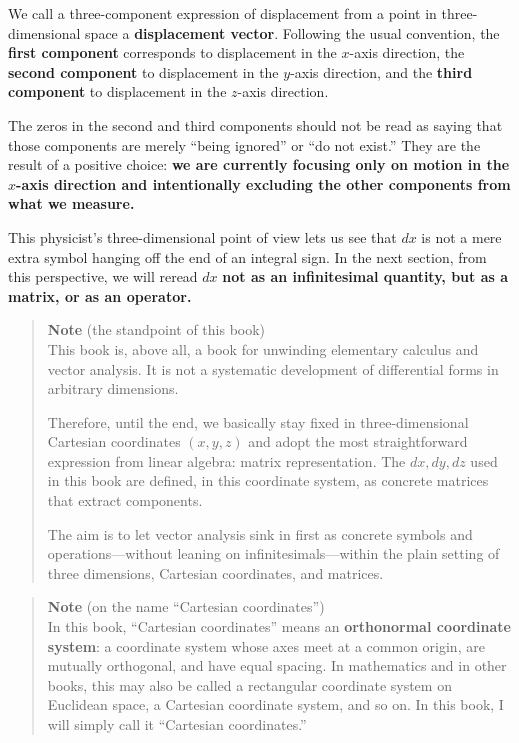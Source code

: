 We call a three-component expression of displacement from a point in
three-dimensional space a \textbf{displacement vector}. Following the
usual convention, the \textbf{first component} corresponds to
displacement in the \(x\)-axis direction, the \textbf{second component}
to displacement in the \(y\)-axis direction, and the
\textbf{third component} to displacement in the \(z\)-axis direction.

The zeros in the second and third components should not be read as
saying that those components are merely ``being ignored'' or ``do not
exist.'' They are the result of a positive choice:
\textbf{we are currently focusing only on motion in the $x$-axis direction and intentionally excluding the other components from what we measure.}

This physicist's three-dimensional point of view lets us see that \(dx\)
is not a mere extra symbol hanging off the end of an integral sign. In
the next section, from this perspective, we will reread \(dx\)
\textbf{not as an infinitesimal quantity, but as a matrix, or as an operator.}

\begin{quote}
\textbf{Note} (the standpoint of this book)\\
This book is, above all, a book for unwinding elementary calculus and
vector analysis. It is not a systematic development of differential
forms in arbitrary dimensions.

Therefore, until the end, we basically stay fixed in three-dimensional
Cartesian coordinates \((x,y,z)\) and adopt the most straightforward
expression from linear algebra: matrix representation. The \(dx,dy,dz\)
used in this book are defined, in this coordinate system, as concrete
matrices that extract components.

The aim is to let vector analysis sink in first as concrete symbols and
operations---without leaning on infinitesimals---within the plain
setting of three dimensions, Cartesian coordinates, and matrices.
\end{quote}

\begin{quote}
\textbf{Note} (on the name ``Cartesian coordinates'')\\
In this book, ``Cartesian coordinates'' means an
\textbf{orthonormal coordinate system}: a coordinate system whose axes
meet at a common origin, are mutually orthogonal, and have equal
spacing. In mathematics and in other books, this may also be called a
rectangular coordinate system on Euclidean space, a Cartesian coordinate
system, and so on. In this book, I will simply call it ``Cartesian
coordinates.''
\end{quote}

